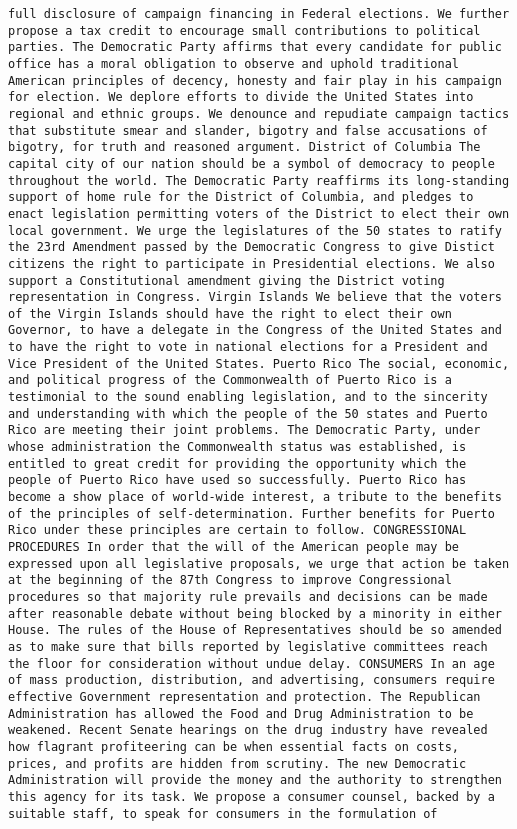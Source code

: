 \documentclass[
]{article}
\begin{document}
\begin{verbatim}
full disclosure of campaign financing in Federal elections. We further propose a tax credit to encourage small contributions to political parties. The Democratic Party affirms that every candidate for public office has a moral obligation to observe and uphold traditional American principles of decency, honesty and fair play in his campaign for election. We deplore efforts to divide the United States into regional and ethnic groups. We denounce and repudiate campaign tactics that substitute smear and slander, bigotry and false accusations of bigotry, for truth and reasoned argument. District of Columbia The capital city of our nation should be a symbol of democracy to people throughout the world. The Democratic Party reaffirms its long-standing support of home rule for the District of Columbia, and pledges to enact legislation permitting voters of the District to elect their own local government. We urge the legislatures of the 50 states to ratify the 23rd Amendment passed by the Democratic Congress to give Distict citizens the right to participate in Presidential elections. We also support a Constitutional amendment giving the District voting representation in Congress. Virgin Islands We believe that the voters of the Virgin Islands should have the right to elect their own Governor, to have a delegate in the Congress of the United States and to have the right to vote in national elections for a President and Vice President of the United States. Puerto Rico The social, economic, and political progress of the Commonwealth of Puerto Rico is a testimonial to the sound enabling legislation, and to the sincerity and understanding with which the people of the 50 states and Puerto Rico are meeting their joint problems. The Democratic Party, under whose administration the Commonwealth status was established, is entitled to great credit for providing the opportunity which the people of Puerto Rico have used so successfully. Puerto Rico has become a show place of world-wide interest, a tribute to the benefits of the principles of self-determination. Further benefits for Puerto Rico under these principles are certain to follow. CONGRESSIONAL PROCEDURES In order that the will of the American people may be expressed upon all legislative proposals, we urge that action be taken at the beginning of the 87th Congress to improve Congressional procedures so that majority rule prevails and decisions can be made after reasonable debate without being blocked by a minority in either House. The rules of the House of Representatives should be so amended as to make sure that bills reported by legislative committees reach the floor for consideration without undue delay. CONSUMERS In an age of mass production, distribution, and advertising, consumers require effective Government representation and protection. The Republican Administration has allowed the Food and Drug Administration to be weakened. Recent Senate hearings on the drug industry have revealed how flagrant profiteering can be when essential facts on costs, prices, and profits are hidden from scrutiny. The new Democratic Administration will provide the money and the authority to strengthen this agency for its task. We propose a consumer counsel, backed by a suitable staff, to speak for consumers in the formulation of 
\end{verbatim}
\end{document}
